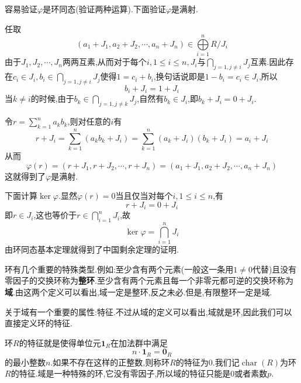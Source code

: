 容易验证$\varphi$是环同态(验证两种运算).下面验证$\varphi$是满射.\par
任取
$$
(a_1+J_1,a_2+J_2,\cdots,a_n+J_n)\in \bigoplus\limits_{i=1}^n R/J_i
$$
由于$J_1,J_2,\cdots,J_n$两两互素,从而对于每个$i,1\leqslant i\leqslant n,J_i$与$\bigcap_{j=1,j\neq i}J_j$互素.因此存在$c_i\in J_i,b_i\in \bigcap_{j=1,j\neq i}J_j$使得$1=c_i+b_i$,换句话说即是$1-b_i=c_i\in J_i$,所以
$$
b_i+J_i=1+J_i
$$
当$k\neq i$的时候,由于$b_k\in \bigcap_{j=1,j\neq k}J_j$,自然有$b_k\in J_i$,即$b_k+J_i=0+J_i$.\par
令$r=\sum_{k=1}^n a_kb_k$,则对任意的$i$有
$$
r+J_i=\sum_{k=1}^n (a_kb_k+J_i)=\sum_{k=1}^n(a_k+J_i)(b_k+J_i)=a_i+J_i
$$
从而
$$
\varphi(r)=(r+J_1,r+J_2,\cdots,r+J_n)=(a_1+J_1,a_2+J_2,\cdots,a_n+J_n)
$$
这就得到了$\varphi$是满射.\par
下面计算$\ker\varphi$.显然$\varphi(r)=0$当且仅当对每个$i,1\leqslant i\leqslant n$,有
$$
r+J_i=0+J_i
$$
即$r\in J_i$,这也等价于$r\in \bigcap_{i=1}^n J_i$,故
$$
\ker\varphi=\bigcap_{i=1}^n J_i
$$
由环同态基本定理就得到了中国剩余定理的证明.\par
环有几个重要的特殊类型.例如:至少含有两个元素(一般这一条用$1\neq 0$代替)且没有零因子的交换环称为\textbf{整环}.至少含有两个元素且每一个非零元都可逆的交换环称为\textbf{域}.由这两个定义可以看出,域一定是整环,反之未必.但是,有限整环一定是域.\par
关于域有一个重要的属性:特征.不过从域的定义可以看出,域就是环,因此我们可以直接定义环的特征.\par
环$R$的特征就是使得单位元$\mathbf{1}_R$在加法群中满足
$$
n\cdot \mathbf{1}_R=\mathbf{0}_R
$$
的最小整数$n$.如果不存在这样的正整数,则称环$R$的特征为0.我们记$\operatorname{char}(R)$为环$R$的特征.域是一种特殊的环,它没有零因子,所以域的特征只能是0或者素数$p$.\par
